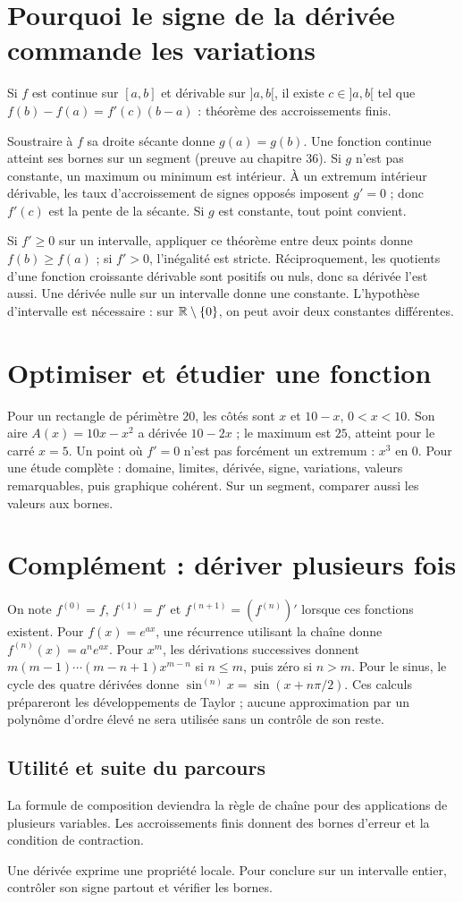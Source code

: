 \documentclass[../cours_tle.tex]{subfiles}
\begin{document}
\section{Pourquoi le signe de la dérivée commande les variations}
\approfondissement
Si $f$ est continue sur $[a,b]$ et dérivable sur $]a,b[$, il existe $c\in]a,b[$ tel que
$f(b)-f(a)=f'(c)(b-a)$ : théorème des accroissements finis.
\begin{demonstration}
Soustraire à $f$ sa droite sécante donne $g(a)=g(b)$. Une fonction continue atteint ses bornes sur un segment (preuve au chapitre 36). Si $g$ n'est pas constante, un maximum ou minimum est intérieur. À un extremum intérieur dérivable, les taux d'accroissement de signes opposés imposent $g'=0$ ; donc $f'(c)$ est la pente de la sécante. Si $g$ est constante, tout point convient.
\end{demonstration}
Si $f'\ge0$ sur un intervalle, appliquer ce théorème entre deux points donne $f(b)\ge f(a)$ ; si $f'>0$, l'inégalité est stricte.
Réciproquement, les quotients d'une fonction croissante dérivable sont positifs ou nuls, donc sa dérivée l'est aussi.
Une dérivée nulle sur un intervalle donne une constante. L'hypothèse d'intervalle est nécessaire : sur $\mathbb{R}\setminus\{0\}$, on peut avoir deux constantes différentes.
\section{Optimiser et étudier une fonction}
Pour un rectangle de périmètre $20$, les côtés sont $x$ et $10-x$, $0<x<10$. Son aire $A(x)=10x-x^2$ a dérivée $10-2x$ ; le maximum est $25$, atteint pour le carré $x=5$.
Un point où $f'=0$ n'est pas forcément un extremum : $x^3$ en $0$.
Pour une étude complète : domaine, limites, dérivée, signe, variations, valeurs remarquables, puis graphique cohérent. Sur un segment, comparer aussi les valeurs aux bornes.
\section{Complément : dériver plusieurs fois}
On note $f^{(0)}=f$, $f^{(1)}=f'$ et $f^{(n+1)}=(f^{(n)})'$ lorsque ces fonctions existent. Pour $f(x)=e^{ax}$, une récurrence utilisant la chaîne donne $f^{(n)}(x)=a^ne^{ax}$. Pour $x^m$, les dérivations successives donnent $m(m-1)\cdots(m-n+1)x^{m-n}$ si $n\le m$, puis zéro si $n>m$. Pour le sinus, le cycle des quatre dérivées donne $\sin^{(n)}x=\sin(x+n\pi/2)$.
Ces calculs prépareront les développements de Taylor ; aucune approximation par un polynôme d'ordre élevé ne sera utilisée sans un contrôle de son reste.
\begin{finchapitre}
\section{Utilité et suite du parcours}
La formule de composition deviendra la règle de chaîne pour des applications de plusieurs variables. Les accroissements finis donnent des bornes d'erreur et la condition de contraction.
\begin{retenir}
Une dérivée exprime une propriété locale. Pour conclure sur un intervalle entier, contrôler son signe partout et vérifier les bornes.
\end{retenir}
\end{finchapitre}
\end{document}

